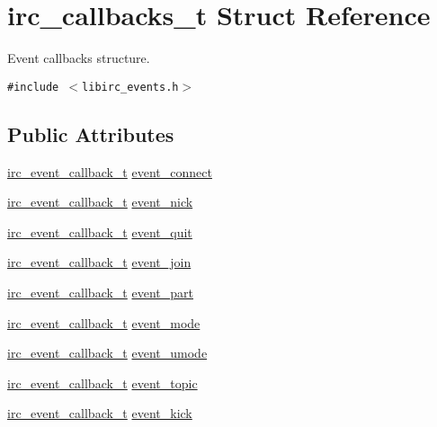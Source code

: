 \hypertarget{structirc__callbacks__t}{
\section{irc\_\-callbacks\_\-t Struct Reference}
\label{structirc__callbacks__t}
}
Event callbacks structure.  


{\tt \#include $<$libirc\_\-events.h$>$}

\subsection*{Public Attributes}
\begin{CompactItemize}
\item 
\hyperlink{libirc__events_8h_c472d3e37df8f172fed3d75e649fac14}{irc\_\-event\_\-callback\_\-t} \hyperlink{structirc__callbacks__t_7294e75ca74ba6dc2b5c18ef8e7795a2}{event\_\-connect}
\item 
\hyperlink{libirc__events_8h_c472d3e37df8f172fed3d75e649fac14}{irc\_\-event\_\-callback\_\-t} \hyperlink{structirc__callbacks__t_6151296f8a888132bd25d7db67ff70a5}{event\_\-nick}
\item 
\hyperlink{libirc__events_8h_c472d3e37df8f172fed3d75e649fac14}{irc\_\-event\_\-callback\_\-t} \hyperlink{structirc__callbacks__t_a4a728c3926384c3781aa65a18ebeb7a}{event\_\-quit}
\item 
\hyperlink{libirc__events_8h_c472d3e37df8f172fed3d75e649fac14}{irc\_\-event\_\-callback\_\-t} \hyperlink{structirc__callbacks__t_8f24c0e2b05425c2308a0106dbaaffec}{event\_\-join}
\item 
\hyperlink{libirc__events_8h_c472d3e37df8f172fed3d75e649fac14}{irc\_\-event\_\-callback\_\-t} \hyperlink{structirc__callbacks__t_0076faaabcf638dba3f08c2048956621}{event\_\-part}
\item 
\hyperlink{libirc__events_8h_c472d3e37df8f172fed3d75e649fac14}{irc\_\-event\_\-callback\_\-t} \hyperlink{structirc__callbacks__t_3d7add398f78ad0a3c5d96133411d60a}{event\_\-mode}
\item 
\hyperlink{libirc__events_8h_c472d3e37df8f172fed3d75e649fac14}{irc\_\-event\_\-callback\_\-t} \hyperlink{structirc__callbacks__t_a92693d9acb2013f6f4b54301ee54d61}{event\_\-umode}
\item 
\hyperlink{libirc__events_8h_c472d3e37df8f172fed3d75e649fac14}{irc\_\-event\_\-callback\_\-t} \hyperlink{structirc__callbacks__t_8a5ab3ffc89e19d5748c58bb675436b5}{event\_\-topic}
\item 
\hyperlink{libirc__events_8h_c472d3e37df8f172fed3d75e649fac14}{irc\_\-event\_\-callback\_\-t} \hyperlink{structirc__callbacks__t_1a8194bfdbf2622e9384fbd1ac1a67d7}{event\_\-kick}

\end{CompactItemize}
